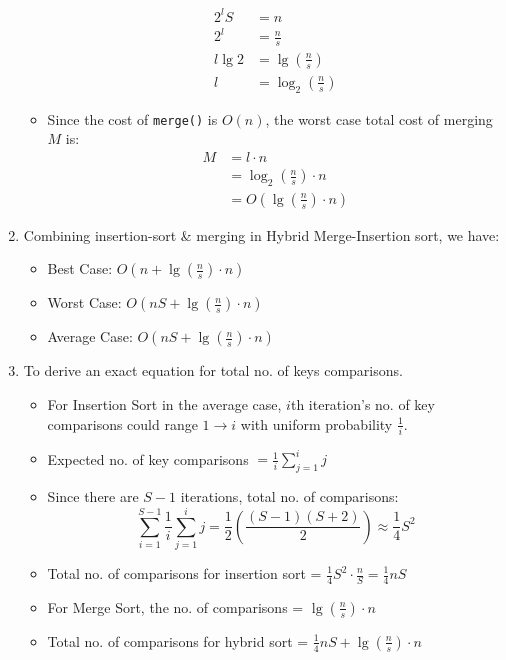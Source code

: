 \begin{enumerate}
\begin{itemize}
\begin{equation}
        \begin{split}
          2^lS &= n \\
          2^l &= \frac{n}{s} \\
          l\lg{2} &= \lg{(\frac{n}{s})} \\
          l &= \log_2{(\frac{n}{s})}
        \end{split}
      \end{equation}
    \item Since the cost of \texttt{merge()} is $O(n)$, the worst case total cost of merging $M$ is:
      \begin{equation}
        \begin{split}
          M &= l \cdot n \\
            &= \log_2{(\frac{n}{s})} \cdot n \\
            &= O(\lg{(\frac{n}{s})} \cdot n)
        \end{split}
      \end{equation}
  \end{itemize}
  \item Combining insertion-sort \& merging in Hybrid Merge-Insertion sort, we have:
    \begin{itemize}
      \item Best Case: $O(n + \lg{(\frac{n}{s})} \cdot n)$
      \item Worst Case: $O(nS + \lg{(\frac{n}{s})} \cdot n)$
      \item Average Case: $O(nS + \lg{(\frac{n}{s})} \cdot n)$
    \end{itemize}
  \pagebreak
  \item To derive an exact equation for total no. of keys comparisons. 
    \begin{itemize}
      \item For Insertion Sort in the average case, $i$th iteration's no. of key comparisons could range $1 \to i$ with uniform probability $\frac{1}{i}$.
      \item Expected no. of key comparisons $= \frac{1}{i}\sum^i_{j=1}{j}$
      \item Since there are $S-1$ iterations, total no. of comparisons:
      \begin{equation}
        \sum^{S-1}_{i=1}\frac{1}{i}\sum^i_{j=1}{j} = \frac{1}{2}(\frac{(S-1)(S+2)}{2}) \approx \frac{1}{4}S^2
      \end{equation}
    \item  Total no. of comparisons for insertion sort = $\frac{1}{4}S^2 \cdot \frac{n}{S} = \frac{1}{4}nS$
      \item For Merge Sort, the no. of comparisons = $\lg{(\frac{n}{s})} \cdot n$
      \item Total no. of comparisons for hybrid sort = $\frac{1}{4}nS + \lg{(\frac{n}{s})} \cdot n$
    \end{itemize}
\end{enumerate}
